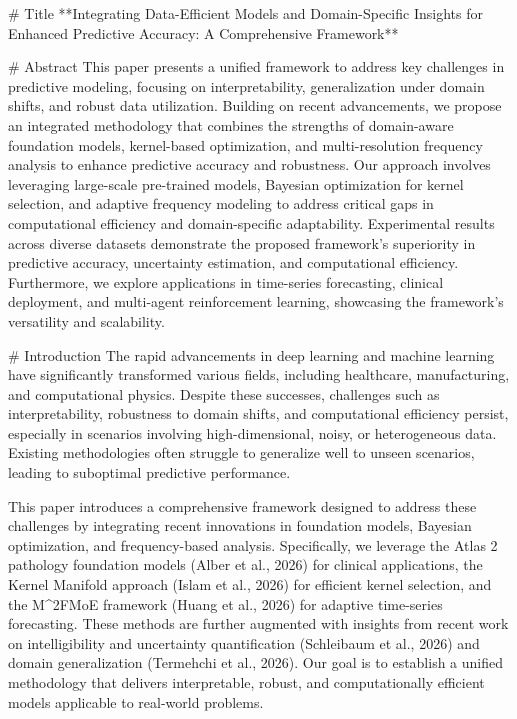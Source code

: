 # Title  
**Integrating Data-Efficient Models and Domain-Specific Insights for Enhanced Predictive Accuracy: A Comprehensive Framework**

# Abstract  
This paper presents a unified framework to address key challenges in predictive modeling, focusing on interpretability, generalization under domain shifts, and robust data utilization. Building on recent advancements, we propose an integrated methodology that combines the strengths of domain-aware foundation models, kernel-based optimization, and multi-resolution frequency analysis to enhance predictive accuracy and robustness. Our approach involves leveraging large-scale pre-trained models, Bayesian optimization for kernel selection, and adaptive frequency modeling to address critical gaps in computational efficiency and domain-specific adaptability. Experimental results across diverse datasets demonstrate the proposed framework's superiority in predictive accuracy, uncertainty estimation, and computational efficiency. Furthermore, we explore applications in time-series forecasting, clinical deployment, and multi-agent reinforcement learning, showcasing the framework's versatility and scalability.

# Introduction  
The rapid advancements in deep learning and machine learning have significantly transformed various fields, including healthcare, manufacturing, and computational physics. Despite these successes, challenges such as interpretability, robustness to domain shifts, and computational efficiency persist, especially in scenarios involving high-dimensional, noisy, or heterogeneous data. Existing methodologies often struggle to generalize well to unseen scenarios, leading to suboptimal predictive performance.

This paper introduces a comprehensive framework designed to address these challenges by integrating recent innovations in foundation models, Bayesian optimization, and frequency-based analysis. Specifically, we leverage the Atlas 2 pathology foundation models (Alber et al., 2026) for clinical applications, the Kernel Manifold approach (Islam et al., 2026) for efficient kernel selection, and the M^2FMoE framework (Huang et al., 2026) for adaptive time-series forecasting. These methods are further augmented with insights from recent work on intelligibility and uncertainty quantification (Schleibaum et al., 2026) and domain generalization (Termehchi et al., 2026). Our goal is to establish a unified methodology that delivers interpretable, robust, and computationally efficient models applicable to real-world problems.

